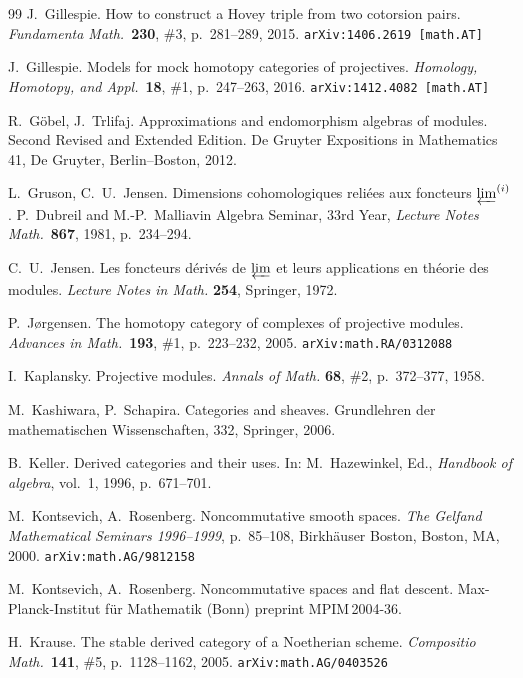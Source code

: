 \documentclass[12pt,a4paper]{amsart}
\newcommand{\+}{\nobreakdash-}
\renewcommand{\:}{\colon}
\theoremstyle{plain}
\theoremstyle{definition}
\begin{document}
\begin{thebibliography}{99}
 J.~Gillespie.
   How to construct a Hovey triple from two cotorsion pairs.
\textit{Fundamenta Math.}\ \textbf{230}, \#3, p.~281--289, 2015.
\texttt{arXiv:1406.2619 [math.AT]}

 J.~Gillespie.
   Models for mock homotopy categories of projectives.
\textit{Homology, Homotopy, and Appl.}\ \textbf{18}, \#1,
p.~247--263, 2016.  \texttt{arXiv:1412.4082 [math.AT]}

 R.~G\"obel, J.~Trlifaj.
   Approximations and endomorphism algebras of modules.
Second Revised and Extended Edition.
De Gruyter Expositions in Mathematics 41,
De Gruyter, Berlin--Boston, 2012.

 L.~Gruson, C.~U.~Jensen.
   Dimensions cohomologiques reli\'ees aux foncteurs
$\varprojlim^{(i)}$.
P.~Dubreil and M.-P.~Malliavin Algebra Seminar, 33rd Year,
\textit{Lecture Notes Math.}\ \textbf{867}, 1981, p.~234--294.

 C.~U.~Jensen.
   Les foncteurs d\'eriv\'es de $\varprojlim$ et leurs applications
en th\'eorie des modules.
\textit{Lecture Notes in Math.} \textbf{254}, Springer, 1972.

 P.~J\o rgensen.
   The homotopy category of complexes of projective modules.
\textit{Advances in Math.}\ \textbf{193}, \#1, p.~223--232, 2005.
\texttt{arXiv:math.RA/0312088}

 I.~Kaplansky.
   Projective modules.
\textit{Annals of Math.} \textbf{68}, \#2, p.~372--377, 1958.

 M.~Kashiwara, P.~Schapira.
   Categories and sheaves.
Grundlehren der mathematischen Wissenschaften, 332, Springer, 2006.

 B.~Keller.
   Derived categories and their uses.
In: M.~Hazewinkel, Ed., \textit{Handbook of algebra}, vol.~1,
1996, p.~671--701.

 M.~Kontsevich, A.~Rosenberg.
   Noncommutative smooth spaces.
\textit{The Gelfand Mathematical Seminars 1996--1999}, p.~85--108,
Birkh\"auser Boston, Boston, MA, 2000.  \texttt{arXiv:math.AG/9812158}
{\par}

 M.~Kontsevich, A.~Rosenberg.
   Noncommutative spaces and flat descent.
Max-Planck-Institut f\"ur Mathematik (Bonn) preprint MPIM\,2004-36.

 H.~Krause.
   The stable derived category of a Noetherian scheme.
\textit{Compositio Math.}\ \textbf{141}, \#5, p.~1128--1162, 2005.
\texttt{arXiv:math.AG/0403526}


\end{thebibliography}
\end{document}
